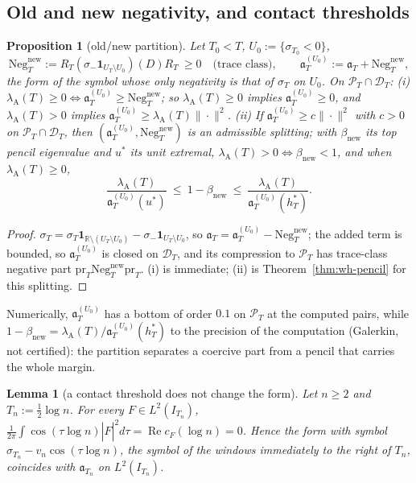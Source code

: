 \documentclass[11pt]{amsart}
\newtheorem{proposition}[theorem]{Proposition}
\newtheorem{lemma}[theorem]{Lemma}
\theoremstyle{definition}
\theoremstyle{remark}
\newcommand{\R}{\mathbb R}
\newcommand{\Rel}{\operatorname{Re}}
\newcommand{\PT}{\mathcal P_T}
\newcommand{\lamA}{\lambda_{\mathrm A}(T)}
\newcommand{\sT}{\sigma_T}
\newcommand{\Fh}{\widehat F}
\newcommand{\cF}{c_F}
\begin{document}
\subsection{Old and new negativity, and contact thresholds}\label{subsec:wh-oldnew}

\begin{proposition}[old/new partition]\label{prop:wh-oldnew}
Let $T_0<T$, $U_0:=\{\sigma_{T_0}<0\}$,
\[
\mathrm{Neg}^{\mathrm{new}}_T:=R_T(\sigma_-\mathbf 1_{U_T\setminus U_0})(D)R_T\ \ge0\quad\text{(trace class)},\qquad
\mathfrak a^{(U_0)}_T:=\mathfrak a_T+\mathrm{Neg}^{\mathrm{new}}_T ,
\]
the form of the symbol whose only negativity is that of $\sT$ on $U_0$. On $\PT\cap\mathcal D_T$:
\emph{(i)} $\lamA\ge0\iff\mathfrak a^{(U_0)}_T\ge\mathrm{Neg}^{\mathrm{new}}_T$; so $\lamA\ge0$ implies $\mathfrak a^{(U_0)}_T\ge0$, and
$\lamA>0$ implies $\mathfrak a^{(U_0)}_T\ge\lamA\|\cdot\|^2$.
\emph{(ii)} If $\mathfrak a^{(U_0)}_T\ge c\|\cdot\|^2$ with $c>0$ on $\PT\cap\mathcal D_T$, then $(\mathfrak a^{(U_0)}_T,\mathrm{Neg}^{\mathrm{new}}_T)$ is an
admissible splitting; with $\beta_{\mathrm{new}}$ its top pencil eigenvalue and $u^*$ its unit extremal,
$\lamA>0\iff\beta_{\mathrm{new}}<1$, and when $\lamA\ge0$,
\[
\frac{\lamA}{\mathfrak a^{(U_0)}_T(u^*)}\ \le\ 1-\beta_{\mathrm{new}}\ \le\ \frac{\lamA}{\mathfrak a^{(U_0)}_T(h^*_T)} .
\]
\end{proposition}

\begin{proof}
$\sT=\sT\mathbf 1_{\R\setminus(U_T\setminus U_0)}-\sigma_-\mathbf 1_{U_T\setminus U_0}$, so $\mathfrak a_T=\mathfrak a^{(U_0)}_T-\mathrm{Neg}^{\mathrm{new}}_T$; the
added term is bounded, so $\mathfrak a^{(U_0)}_T$ is closed on $\mathcal D_T$, and its compression to $\PT$ has trace-class
negative part $\mathrm{pr}_T\mathrm{Neg}^{\mathrm{new}}_T\mathrm{pr}_T$. (i) is immediate; (ii) is Theorem~\ref{thm:wh-pencil} for this
splitting.
\end{proof}

Numerically, $\mathfrak a^{(U_0)}_T$ has a bottom of order $0.1$ on $\PT$ at the computed pairs, while
$1-\beta_{\mathrm{new}}=\lamA/\mathfrak a^{(U_0)}_T(h^*_T)$ to the precision of the computation (Galerkin, not
certified): the partition separates a coercive part from a pencil that carries the whole margin.

\begin{lemma}[a contact threshold does not change the form]\label{lem:wh-birth}
Let $n\ge2$ and $T_n:=\frac12\log n$. For every $F\in L^2(I_{T_n})$, $\frac1{2\pi}\int\cos(\tau\log n)|\Fh|^2d\tau=\Rel\cF(\log n)=0$.
Hence the form with symbol $\sigma_{T_n}-v_n\cos(\tau\log n)$, the symbol of the windows immediately to the right
of $T_n$, coincides with $\mathfrak a_{T_n}$ on $L^2(I_{T_n})$.
\end{lemma}
\end{document}
